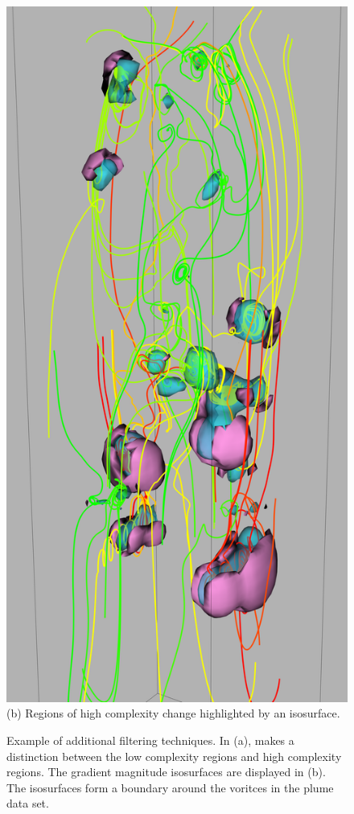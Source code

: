 \documentclass[journal]{vgtc}                %
\begin{document}
\begin{figure}[t]
\begin{minipage}{0.47\linewidth}
		\end{minipage}
		\begin{minipage}{0.47\linewidth}
			\centering \small
			\includegraphics[height = 2\linewidth]{Images/plume_grad_crop.png}\\(b) Regions of high complexity change highlighted by an isosurface. \vspace{0.2em}
		\end{minipage}
	\caption{Example of additional filtering techniques. In (a), makes a distinction between the low complexity regions and high complexity regions. The gradient magnitude isosurfaces are displayed in (b). The isosurfaces form a boundary around the voritces in the plume data set.}
	\label{fig:plume_additional}
\end{figure}
\end{document}
